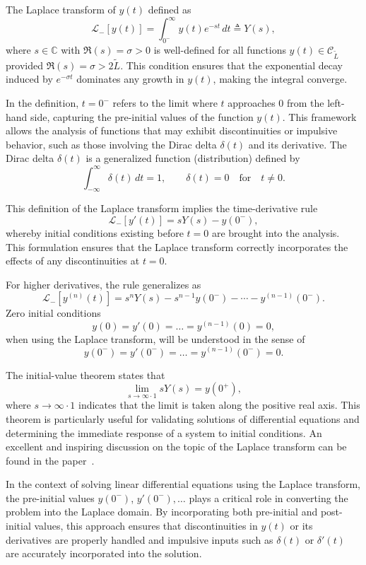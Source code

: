 \documentclass[preprint,12pt]{elsarticle}
\begin{document}
\begin{rem}
The Laplace transform of \(y(t)\) defined as
\[
\mathcal{L}_-[y(t)] = \int_{0^-}^\infty y(t)e^{-st} \, dt\triangleq Y(s),
\]
where \(s \in \mathbb{C}\) with \(\Re(s) = \sigma > 0\) is well-defined for all functions \(y(t) \in \mathcal{C}_{\tilde{L}}\) provided \(\Re(s) = \sigma > 2\tilde{L}\). This condition ensures that the exponential decay induced by \(e^{-\sigma t}\) dominates any growth in \(y(t)\), making the integral converge.


In the definition, \( t = 0^- \) refers to the limit where \( t \) approaches \( 0 \) from the left-hand side, capturing the pre-initial values of the function \( y(t) \). 
This framework allows the analysis of functions that may exhibit discontinuities or impulsive behavior, such as those involving the Dirac delta \( \delta(t) \) and its derivative. The Dirac delta \( \delta(t) \) is a generalized function (distribution) defined by
\[
\int_{-\infty}^{\infty} \delta(t)\, dt = 1, \qquad \delta(t) = 0 \quad \text{for} \quad t \neq 0.
\]

This definition of the Laplace transform implies the time-derivative rule
\[
\mathcal{L}_-[y'(t)] = sY(s) - y(0^-),
\]
whereby initial conditions existing before $t = 0 $ are brought into the analysis. This formulation ensures that the Laplace transform correctly incorporates the effects of any discontinuities at \(t = 0\).

For higher derivatives, the rule generalizes as
\[
\mathcal{L}_-[y^{(n)}(t)] = s^nY(s) - s^{n-1}y(0^-) - \cdots - y^{(n-1)}(0^-).
\]
Zero initial conditions  
\[
y(0) = y'(0) = \dots = y^{(n-1)}(0) = 0,
\]  
when using the Laplace transform, will be understood in the sense of  
\[
y(0^-) = y'(0^-) = \dots = y^{(n-1)}(0^-) = 0.
\]  

The initial-value theorem states that 
\begin{equation}\label{initialValueThm}
\lim_{s \to \infty \cdot 1} sY(s) = y(0^+),
\end{equation}
where \(s \to \infty \cdot 1\) indicates that the limit is taken along the positive real axis. This theorem is particularly useful for validating solutions of differential equations and determining the immediate response of a system to initial conditions. An excellent and inspiring discussion on the topic of the Laplace transform can be found in the paper~\cite{Lundberg2007}.

In the context of solving linear differential equations using the Laplace transform, the pre-initial values \(y(0^-)\), \(y'(0^-), \dots\)  plays a critical role in converting the problem into the Laplace domain. By incorporating both pre-initial and post-initial values, this approach ensures that discontinuities in \(y(t)\) or its derivatives are properly handled and  impulsive inputs such as \(\delta(t)\) or \(\delta'(t)\) are accurately incorporated into the solution.
\end{rem}
\end{document}
